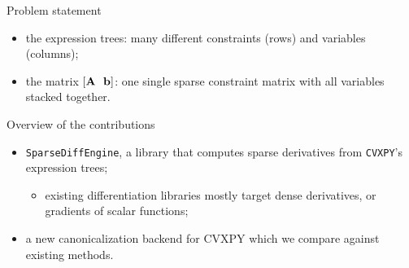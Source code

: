 \documentclass[10pt,mathserif,aspectratio=169]{beamer}
\newcommand{\bul}{\setlength\itemsep{1.1ex}}
\newcommand{\sde}{\texttt{SparseDiffEngine}}
\newcommand{\cvxpy}{\texttt{CVXPY}}
\begin{document}
\begin{frame}{Problem statement}
\begin{center}
{}
\end{center}
\vspace{1ex}
\begin{itemize}\small\bul
  \item the expression trees: many different constraints (rows) and variables (columns);
  \item the matrix $[\mmat{A}\ \ \mvec{b}]$: one single sparse constraint matrix with all
        variables stacked together.
\end{itemize}
\end{frame}

\begin{frame}{Overview of the contributions}
\vspace{-0.5ex}
\begin{itemize}\small\bul
  \item \sde{}, a library that computes sparse derivatives from \cvxpy{}'s expression trees;
  \begin{itemize}\small
    \item[--] existing differentiation libraries mostly target dense derivatives, or
          gradients of scalar functions;
  \end{itemize}
  \item a new canonicalization backend for CVXPY which we compare against existing methods.
\end{itemize}
\end{frame}
\end{document}
